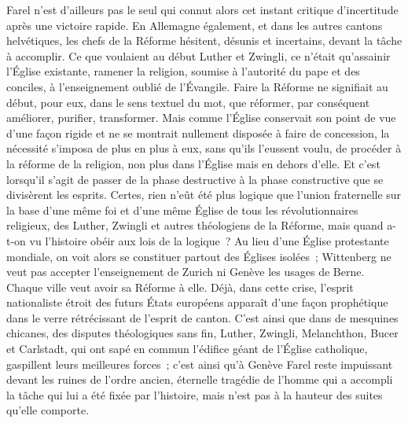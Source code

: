 \documentclass[french,twoside]{book} %
\newcommand{\astermono}{\medskip\centerline{\color{rubric}\large\selectfont{\syms ✻}}\medskip\par}%
\begin{document}
Farel n’est d’ailleurs pas le seul qui connut alors cet instant critique d’incertitude après une victoire rapide. En Allemagne également, et dans les autres cantons helvétiques, les chefs de la Réforme hésitent, désunis et incertains, devant la tâche à accomplir. Ce que voulaient au début Luther et Zwingli, ce n’était qu’assainir l’Église existante, ramener la religion, soumise à l’autorité du pape et des conciles, à l’enseignement oublié de l’Évangile. Faire la Réforme ne signifiait au début, pour eux, dans le sens textuel du mot, que réformer, par conséquent améliorer, purifier, transformer. Mais comme l’Église conservait son point de vue d’une façon rigide et ne se montrait nullement disposée à faire de concession, la nécessité s’imposa de plus en plus à eux, sans qu’ils l’eussent voulu, de procéder à la réforme de la religion, non plus dans l’Église mais en dehors d’elle. Et c’est lorsqu’il s’agit de passer de la phase destructive à la phase constructive que se divisèrent les esprits. Certes, rien n’eût été plus logique que l’union fraternelle sur la base d’une même foi et d’une même Église de tous les révolutionnaires religieux, des Luther, Zwingli et autres théologiens de la Réforme, mais quand a-t-on vu l’histoire obéir aux lois de la logique ? Au lieu d’une Église protestante mondiale, on voit alors se constituer partout des Églises isolées ; Wittenberg ne veut pas accepter l’enseignement de Zurich ni Genève les usages de Berne. Chaque ville veut avoir sa Réforme à elle. Déjà, dans cette crise, l’esprit nationaliste étroit des futurs États européens apparaît d’une façon prophétique dans le verre rétrécissant de l’esprit de canton. C’est ainsi que dans de mesquines chicanes, des disputes théologiques sans fin, Luther, Zwingli, Melanchthon, Bucer et Carlstadt, qui ont sapé en commun l’édifice géant de l’Église catholique, gaspillent leurs meilleures forces ; c’est ainsi qu’à Genève Farel reste impuissant devant les ruines de l’ordre ancien, éternelle tragédie de l’homme qui a accompli la tâche qui lui a été fixée par l’histoire, mais n’est pas à la hauteur des suites qu’elle comporte.\par

\astermono
\end{document}
